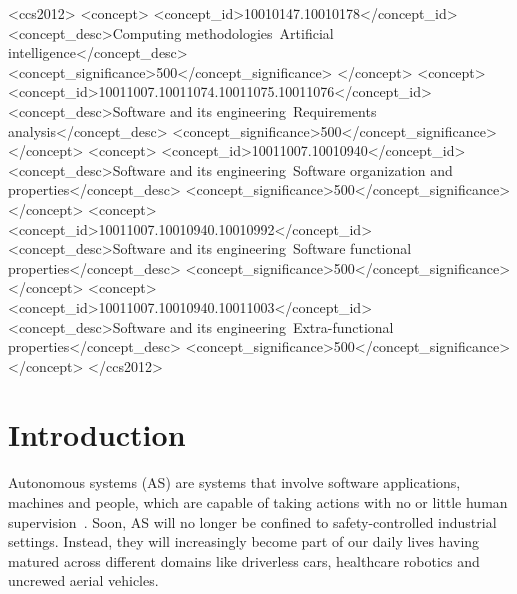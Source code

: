 \documentclass[sigconf,nonacm]{acmart}%
\begin{document}
	\begin{CCSXML}
		<ccs2012>
		<concept>
		<concept_id>10010147.10010178</concept_id>
		<concept_desc>Computing methodologies~Artificial intelligence</concept_desc>
		<concept_significance>500</concept_significance>
		</concept>
		<concept>
		<concept_id>10011007.10011074.10011075.10011076</concept_id>
		<concept_desc>Software and its engineering~Requirements analysis</concept_desc>
		<concept_significance>500</concept_significance>
		</concept>
		<concept>
		<concept_id>10011007.10010940</concept_id>
		<concept_desc>Software and its engineering~Software organization and properties</concept_desc>
		<concept_significance>500</concept_significance>
		</concept>
		<concept>
		<concept_id>10011007.10010940.10010992</concept_id>
		<concept_desc>Software and its engineering~Software functional properties</concept_desc>
		<concept_significance>500</concept_significance>
		</concept>
		<concept>
		<concept_id>10011007.10010940.10011003</concept_id>
		<concept_desc>Software and its engineering~Extra-functional properties</concept_desc>
		<concept_significance>500</concept_significance>
		</concept>
		</ccs2012>
	\end{CCSXML}
	
	
	
	
	\maketitle
	
	\section{Introduction}\label{introduction}
	Autonomous systems (AS) are systems that involve software applications, machines and people, which are capable of taking actions with no or little human supervision~\cite{Murukannaiah2020}. 
	Soon, AS will no longer be confined to safety-controlled industrial settings. 
	Instead, they will increasingly become part of our daily lives having matured across different domains like driverless cars, healthcare robotics and uncrewed aerial vehicles. 
	
\end{document}
